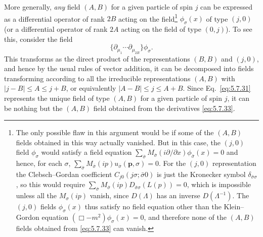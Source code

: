 More generally, \emph{any} field $(A,B)$ for a given particle of spin $j$ can
be expressed as a differential operator of rank $2B$ acting on the
field\footnote{The only possible flaw in this argument would be if some of the
$(A,B)$ fields obtained in this way actually vanished. But in this case, the
$(j,0)$ field $\phi_\sigma$ would satisfy a field equation
$\sum_{\bar\sigma}M_{\bar\sigma}(i\partial/\partial x)
\phi_{\bar\sigma}(x)=0$ and hence, for each $\sigma$,
$\sum_{\bar\sigma}M_{\bar\sigma}(ip)u_{\bar\sigma}(\mathbf p,\sigma)=0$.
For the
$(j,0)$ representation the Clebsch--Gordan coefficient
$C_{j0}(j\sigma;\bar\sigma0)$ is just the Kronecker symbol
$\delta_{\bar\sigma\sigma}$, so this would require
$\sum_{\bar\sigma}M_{\bar\sigma}(ip)D_{\bar\sigma\sigma}(L(p))=0$,
which is impossible unless all the $M_\sigma(ip)$ vanish, since $D(\Lambda)$
has an inverse $D(\Lambda^{-1})$. The $(j,0)$ fields $\phi_\sigma(x)$ thus
satisfy no field equation other than the Klein--Gordon equation
$(\Box-m^2)\phi_\sigma(x)=0$, and therefore none of the $(A,B)$ fields obtained
from \eqref{eq:5.7.33} can vanish.} $\phi_\sigma(x)$ of type $(j,0)$ (or a differential
operator of rank $2A$ acting on the field of type $(0,j)$). To see this,
consider the field
\begin{equation}
\{\partial_{\mu_1}\cdots\partial_{\mu_{2B}}\}\phi_\sigma.
\tag{5.7.33}\label{eq:5.7.33}
\end{equation}
This transforms as the direct product of the representations $(B,B)$ and
$(j,0)$, and hence by the usual rules of vector addition, it can be decomposed
into fields transforming according to all the irreducible representations
$(A,B)$ with $|j-B|\leq A\leq j+B$, or equivalently
$|A-B|\leq j\leq A+B$. Since Eq.~\eqref{eq:5.7.31} represents the unique field of type
$(A,B)$ for a given particle of spin $j$, it can be nothing but the $(A,B)$
field obtained from the derivatives \eqref{eq:5.7.33}.

